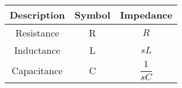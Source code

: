 \begin{tabular}{c|c|c}
    \hline
    Description & Symbol & Impedance\\
    \hline
    Resistance & R &  $R$\\
     Inductance & L &  $sL$\\
     Capacitance & C &  $\dfrac{1}{sC}$\\
    \hline
\end{tabular}
